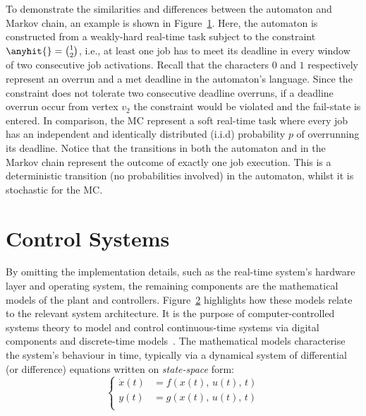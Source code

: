 \begin{figure}[t]
    \centering
    
    \caption{}
    \label{fig:kappa:state-machine}
\end{figure}
%
To demonstrate the similarities and differences between the automaton and Markov chain, an example is shown in Figure~\ref{fig:kappa:state-machine}.
Here, the automaton is constructed from a weakly-hard real-time task subject to the constraint $\anyhit{} = \binom{1}{2}$, i.e., at least one job has to meet its deadline in every window of two consecutive job activations.
Recall that the characters $0$ and $1$ respectively represent an overrun and a met deadline in the automaton's language.
Since the constraint does not tolerate two consecutive deadline overruns, if a deadline overrun occur from vertex $v_2$ the constraint would be violated and the fail-state is entered.
In comparison, the MC represent a soft real-time task where every job has an independent and identically distributed (i.i.d) probability $p$ of overrunning its deadline.
Notice that the transitions in both the automaton and in the Markov chain represent the outcome of exactly one job execution.
This is a deterministic transition (no probabilities involved) in the automaton, whilst it is stochastic for the MC.



\section{Control Systems}%
\label{sec:background:ctrl}%
%
\begin{figure}[t]
    \centering
    
    \caption{}
    \label{fig:control-structure-abstraction}
\end{figure}
%
By omitting the implementation details, such as the real-time system's hardware layer and operating system, the remaining components are the mathematical models of the plant and controllers.
Figure~\ref{fig:control-structure-abstraction} highlights how these models relate to the relevant system architecture.
It is the purpose of computer-controlled systems theory to model and control continuous-time systems via digital components and discrete-time models~\cite{Astrom:1997}.
The mathematical models characterise the system's behaviour in time, typically via a dynamical system of differential (or difference) equations written on \emph{state-space} form:
%
\begin{equation}%
    \label{eq:state-space}%
    \left\{\begin{aligned}
        \dot{x}(t) &= f(x(t),\, u(t),\, t) \\
        y(t) &= g(x(t),\, u(t),\, t) \\
    \end{aligned}\right.
\end{equation}

